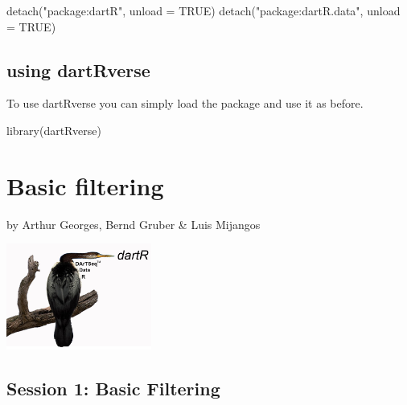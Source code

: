\documentclass[
  letterpaper,
  DIV=11,
  numbers=noendperiod]{scrreprt}
\newenvironment{Shaded}{\begin{snugshade}}{\end{snugshade}}
\newcommand{\AttributeTok}[1]{\textcolor[rgb]{0.49,0.56,0.16}{#1}}
\newcommand{\ConstantTok}[1]{\textcolor[rgb]{0.53,0.00,0.00}{#1}}
\newcommand{\FunctionTok}[1]{\textcolor[rgb]{0.02,0.16,0.49}{#1}}
\newcommand{\NormalTok}[1]{\textcolor[rgb]{0.00,0.44,0.13}{#1}}
\newcommand{\StringTok}[1]{\textcolor[rgb]{0.25,0.44,0.63}{#1}}
\begin{document}
\begin{Shaded}
\begin{Highlighting}[]
\FunctionTok{detach}\NormalTok{(}\StringTok{"package:dartR"}\NormalTok{, }\AttributeTok{unload =} \ConstantTok{TRUE}\NormalTok{)}
\FunctionTok{detach}\NormalTok{(}\StringTok{"package:dartR.data"}\NormalTok{, }\AttributeTok{unload =} \ConstantTok{TRUE}\NormalTok{)}
\end{Highlighting}
\end{Shaded}

\hypertarget{using-dartrverse}{%
\section*{using dartRverse}\label{using-dartrverse}}


To use dartRverse you can simply load the package and use it as before.

\begin{Shaded}
\begin{Highlighting}[]
\FunctionTok{library}\NormalTok{(dartRverse)}
\end{Highlighting}
\end{Shaded}


\hypertarget{basic-filtering}{%
\chapter*{Basic filtering}\label{basic-filtering}}


by Arthur Georges, Bernd Gruber \& Luis Mijangos

\includegraphics[width=1.875in,height=\textheight]{images/logo_old.jpg}
\newpage

\hypertarget{session-1-basic-filtering}{%
\section*{Session 1: Basic Filtering}\label{session-1-basic-filtering}}
\end{document}

